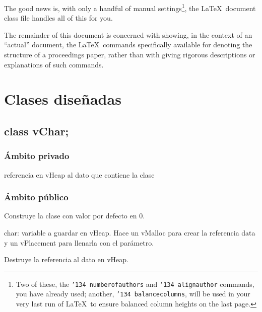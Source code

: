 \documentclass{vldb}
\begin{document}
The good news is, with only a handful of manual
settings\footnote{Two of these, the {\texttt{\char'134 numberofauthors}}
and {\texttt{\char'134 alignauthor}} commands, you have
already used; another, {\texttt{\char'134 balancecolumns}}, will
be used in your very last run of \LaTeX\ to ensure
balanced column heights on the last page.}, the \LaTeX\ document
class file handles all of this for you.

The remainder of this document is concerned with showing, in
the context of an ``actual'' document, the \LaTeX\ commands
specifically available for denoting the structure of a
proceedings paper, rather than with giving rigorous descriptions
or explanations of such commands.


\section{Clases diseñadas}


\subsection{class vChar;}


\subsubsection{Ámbito privado}

referencia en vHeap al dato que contiene la clase


\subsubsection{Ámbito público}

Construye la clase con valor por defecto en 0.

char: variable a guardar en vHeap.
Hace un vMalloc para crear la referencia data y un vPlacement para llenarla con el parámetro.

Destruye la referencia al dato en vHeap.

\subsubsubsection{}
\subsubsubsubsection{}
\subsubsubsubsection{}

\subsubsubsection{}
\subsubsubsubsection{}
\subsubsubsubsection{}
\end{document}
